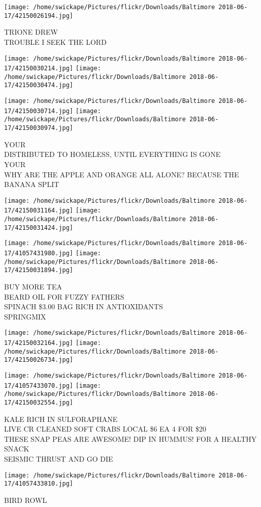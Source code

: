 \documentclass[10pt,letterpaper]{article}
\begin{document}
\vspace{0.25in}
\texttt{[image: /home/swickape/Pictures/flickr/Downloads/Baltimore 2018-06-17/42150026194.jpg]}

TRIONE DREW\\
TROUBLE I SEEK THE LORD\\
\pagebreak

\texttt{[image: /home/swickape/Pictures/flickr/Downloads/Baltimore 2018-06-17/42150030214.jpg]}
\texttt{[image: /home/swickape/Pictures/flickr/Downloads/Baltimore 2018-06-17/42150030474.jpg]}

\texttt{[image: /home/swickape/Pictures/flickr/Downloads/Baltimore 2018-06-17/42150030714.jpg]}
\texttt{[image: /home/swickape/Pictures/flickr/Downloads/Baltimore 2018-06-17/42150030974.jpg]}

YOUR\\
DISTRIBUTED TO HOMELESS, UNTIL EVERYTHING IS GONE\\
YOUR\\
WHY ARE THE APPLE AND ORANGE ALL ALONE?  BECAUSE THE BANANA SPLIT\\
\pagebreak

\texttt{[image: /home/swickape/Pictures/flickr/Downloads/Baltimore 2018-06-17/42150031164.jpg]}
\texttt{[image: /home/swickape/Pictures/flickr/Downloads/Baltimore 2018-06-17/42150031424.jpg]}

\texttt{[image: /home/swickape/Pictures/flickr/Downloads/Baltimore 2018-06-17/41057431980.jpg]}
\texttt{[image: /home/swickape/Pictures/flickr/Downloads/Baltimore 2018-06-17/42150031894.jpg]}

BUY MORE TEA\\
BEARD OIL FOR FUZZY FATHERS\\
SPINACH \$3.00 BAG RICH IN ANTIOXIDANTS\\
SPRINGMIX\\
\pagebreak

\texttt{[image: /home/swickape/Pictures/flickr/Downloads/Baltimore 2018-06-17/42150032164.jpg]}
\texttt{[image: /home/swickape/Pictures/flickr/Downloads/Baltimore 2018-06-17/42150026734.jpg]}

\texttt{[image: /home/swickape/Pictures/flickr/Downloads/Baltimore 2018-06-17/41057433070.jpg]}
\texttt{[image: /home/swickape/Pictures/flickr/Downloads/Baltimore 2018-06-17/42150032554.jpg]}

KALE RICH IN SULFORAPHANE\\
LIVE CR CLEANED SOFT CRABS LOCAL \$6 EA 4 FOR \$20\\
THESE SNAP PEAS ARE AWESOME!  DIP IN HUMMUS!  FOR A HEALTHY SNACK\\
SEISMIC THRUST AND GO DIE\\
\pagebreak

\texttt{[image: /home/swickape/Pictures/flickr/Downloads/Baltimore 2018-06-17/41057433810.jpg]}

BIRD ROWL\\
\pagebreak
\end{document}
